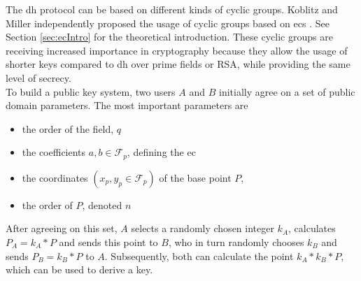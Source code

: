 The \gls{dh} protocol can be based on different kinds of cyclic groups. Koblitz and Miller independently proposed the usage of cyclic groups based on
\glspl{ec} \cite{eccKoblitz} \cite{eccMiller}. See Section \ref{sec:ecIntro} for the theoretical introduction.
These cyclic groups are receiving increased importance in cryptography because they allow the usage
of shorter keys compared to \gls{dh} over prime fields or RSA, while providing the same level of secrecy.
\\
To build a public key system, two users $A$ and $B$ initially agree on a set of public domain parameters. The most important parameters are \cite{ecDP}	
\begin{itemize}
 \item the order of the field, $q$
 \item the coefficients $a, b \in \mathcal{F}_p$, defining the \gls{ec}
 \item the coordinates $(x_p, y_p \in \mathcal{F}_p)$ of the base point $P$, 
 \item the order of $P$, denoted $n$
\end{itemize}
After agreeing on this set, $A$ selects a randomly chosen integer $k_A$, calculates $P_A = k_A*P$ and sends
this point to $B$, who in turn randomly chooses $k_B$ and sends $P_B = k_B*P$ to $A$. Subsequently, both can calculate the point $k_A*k_B*P$, which can be used
to derive a key.

